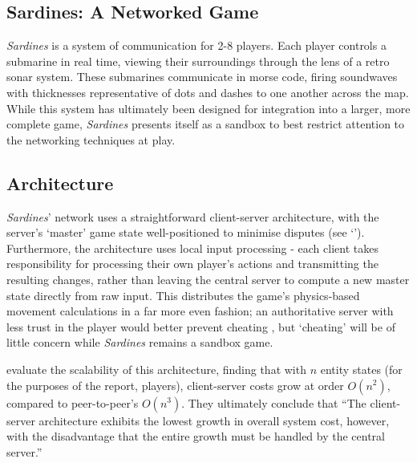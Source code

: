 \documentclass[a4paper, 10pt]{article}
\begin{document}
\graphicspath{{./Images/}}
\begin{flushleft}

\section*{Sardines: A Networked Game}

\textit{Sardines} is a system of communication for 2-8 players. Each player controls a submarine in real time, viewing their surroundings through the lens of a retro sonar system. These submarines communicate in morse code, firing soundwaves with thicknesses representative of dots and dashes to one another across the map. While this system has ultimately been designed for integration into a larger, more complete game, \textit{Sardines} presents itself as a sandbox to best restrict attention to the networking techniques at play.

\subsection*{Architecture}\label{Architecture}

\textit{Sardines}' network uses a straightforward client-server architecture, with the server's `master' game state well-positioned to minimise disputes (see `'). Furthermore, the architecture uses local input processing - each client takes responsibility for processing their own player's actions and transmitting the resulting changes, rather than leaving the central server to compute a new master state directly from raw input. This distributes the game's physics-based movement calculations in a far more even fashion; an authoritative server with less trust in the player would better prevent cheating \citep{gmbta10}, but `cheating' will be of little concern while \textit{Sardines} remains a sandbox game.

\vspace{5pt}\noindent
\citeauthor{bauer04} \citeyearpar{bauer04} evaluate the scalability of this architecture, finding that with $n$ entity states (for the purposes of the report, players), client-server costs grow at order $O(n^2)$, compared to peer-to-peer's $O(n^3)$. They ultimately conclude that ``The client-server architecture exhibits the lowest growth in overall system cost, however, with the disadvantage that the entire growth must be handled by the central server.''  


\end{flushleft}
\end{document}
